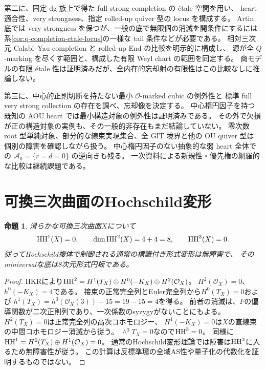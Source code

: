 \documentclass[11pt,a4paper]{ltjsarticle}
\newtheorem{proposition}[theorem]{命題}
\theoremstyle{definition}\newtheorem{remark}[theorem]{注意}
\newcommand{\OO}{\mathcal O}\newcommand{\rank}{\operatorname{rank}}
\begin{document}
第二に、固定 dg 族上で得た full strong completion の \'etale 空間を用い、
heart 適合性、very strongness、指定 rolled-up quiver 型の locus を構成する。
Artin 底では very strongness を保つが、一般の底で無限個の消滅を開条件にするには
系\ref{cor:q-completion-etale-locus}の一様な tail 条件などが必要である。
相対三次元 Calabi--Yau completion と rolled-up End の比較を明示的に構成し、
源が全 $Q$-marking を尽くす範囲と、構成した有限 Weyl chart の範囲を同定する。
商モデルの有限 \'etale 性は証明済みだが、全内在的忘却射の有限性はこの比較なしに推論しない。

第三に、中心的正則切断を持たない最小 $\mathcal O$-marked cubic の例外性と
標準 full very strong collection の存在を調べ、忘却像を決定する。
中心楕円因子を持つ既知の AOU heart では最小構造対象の例外性は証明済みである。
その外で欠損が正の構造対象の実例も、その一般的非存在もまだ結論していない。
零次数 root 型単純対象、部分的な線束実現集合、全 GIT 境界と他の OU quiver 型は
個別の障害を確認しながら扱う。
中心楕円因子のない抽象的な弱 heart 全体での
$\mathcal A_0=\{r=d=0\}$ の逆向きも残る。
一次資料による新規性・優先権の網羅的な比較は継続課題である。

\appendix
\section{可換三次曲面のHochschild変形}\label{sec:hh}
\begin{proposition}\label{prop:hh}
滑らかな可換三次曲面$X$について
\[
 \operatorname{HH}^1(X)=0,\qquad \dim\operatorname{HH}^2(X)=4+4=8,\qquad \operatorname{HH}^3(X)=0.
\]
従ってHochschild複体で制御される通常の標識付き形式変形は無障害で、
そのminiversalな底は8次元形式円板である。
\end{proposition}
\begin{proof}
HKRにより$\HH^2=H^1(T_X)\oplus H^0(-K_X)\oplus H^2(\OO_X)$。
$H^2(\OO_X)=0$、$h^0(-K_X)=4$である。
接束の正常完全列とEuler完全列から$H^0(T_X)=0$および
$h^1(T_X)=h^0(\OO_X(3))-15=19-15=4$を得る。
前者の消滅は、$F$の偏導関数が二次正則列であり、一次係数のsyzygyがないことにもよる。
$H^2(T_X)=0$は正常完全列の高次コホモロジー、
$H^1(-K_X)=0$は$X$の直線束の中間コホモロジー消滅から従う。
$\wedge^3T_X=0$なので$\operatorname{HH}^3=0$。
同様に$\HH^1=H^0(T_X)\oplus H^1(\OO_X)=0$。
通常のHochschild変形理論では障害は$\operatorname{HH}^3$に入るため無障害性が従う。
この計算は反標準環の全域AS性や量子化の代数化を証明するものではない。
\end{proof}






\end{document}
